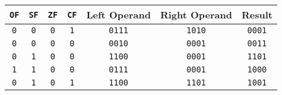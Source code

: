 \documentclass{article}
\begin{document}
{\begin{itemize}
    \begin{center}
      \begin{tabular}{ccccccc}
        \texttt{OF} & \texttt{SF} & \texttt{ZF} & \texttt{CF} & Left Operand  & Right Operand & Result \\
        \hline
        \texttt{0}  & \texttt{0}  & \texttt{0}  & \texttt{1}  & \texttt{0111} & \texttt{1010} & \texttt{0001} \\
        \texttt{0}  & \texttt{0}  & \texttt{0}  & \texttt{0}  & \texttt{0010} & \texttt{0001} & \texttt{0011} \\
        \texttt{0}  & \texttt{1}  & \texttt{0}  & \texttt{0}  & \texttt{1100} & \texttt{0001} & \texttt{1101} \\
        \texttt{1}  & \texttt{1}  & \texttt{0}  & \texttt{0}  & \texttt{0111} & \texttt{0001} & \texttt{1000} \\
        \texttt{0}  & \texttt{1}  & \texttt{0}  & \texttt{1}  & \texttt{1100} & \texttt{1101} & \texttt{1001}
      \end{tabular}
    \end{center}


\end{itemize}}
\end{document}
